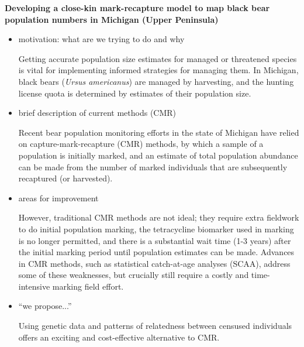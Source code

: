 \documentclass[12pt]{article}
\begin{document}
%
\begin{center}
\textbf{Developing a close-kin mark-recapture model to map black bear population numbers in Michigan (Upper Peninsula)}
\end{center}
%            
\begin{itemize}
\item motivation: what are we trying to do and why

Getting accurate population size estimates 
for managed or threatened species  
is vital for implementing informed strategies for managing them.
In Michigan, black bears (\textit{Ursus americanus}) 
are managed by harvesting, 
and the hunting license quota is determined by 
estimates of their population size.

\item brief description of current methods (CMR)

Recent bear population monitoring efforts 
in the state of Michigan have relied on 
capture-mark-recapture (CMR) methods, 
by which a sample of a population is initially marked, 
and an estimate of total population abundance 
can be made from the number of marked individuals 
that are subsequently recaptured (or harvested). 

\item areas for improvement

However, traditional CMR methods are not ideal;  
they require extra fieldwork to do initial population marking, 
the tetracycline biomarker used in marking is no longer permitted, 
and there is a substantial wait time (1-3 years) after the 
initial marking period until population estimates can be made.
Advances in CMR methods, 
such as statistical catch-at-age analyses (SCAA),
address some of these weaknesses, 
but crucially still require a costly and time-intensive 
marking field effort.

\item ``we propose...'' 

Using genetic data and patterns of relatedness 
between censused individuals offers 
an exciting and cost-effective alternative to CMR.


\end{itemize}
\end{document}

